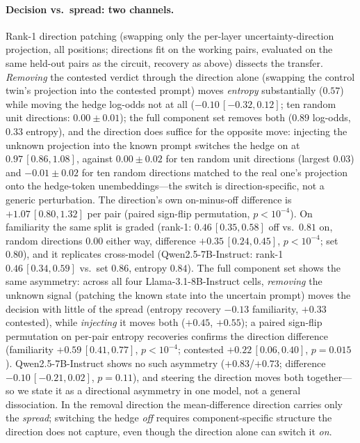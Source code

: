 \documentclass{article}
\newcommand{\lm}{Llama-3.1-8B-Instruct}
\newcommand{\qw}{Qwen2.5-7B-Instruct}
\begin{document}
\paragraph{Decision vs.\ spread: two channels.}
Rank-1 direction patching (swapping only the per-layer uncertainty-direction projection, all positions;
directions fit on the working pairs, evaluated on the same held-out pairs as the circuit, recovery as
above) dissects the transfer. \emph{Removing} the contested verdict through the direction alone (swapping
the control twin's projection into the contested prompt) moves \emph{entropy} substantially ($0.57$)
while moving the hedge log-odds not at all ($-0.10\,[-0.32,0.12]$; ten random unit directions:
$0.00 \pm 0.01$); the full component set removes both ($0.89$ log-odds, $0.33$ entropy), and the
direction does suffice for the opposite move: injecting the unknown projection into the known prompt
switches the hedge on at $0.97\,[0.86,1.08]$, against $0.00 \pm 0.02$ for ten random unit directions
(largest $0.03$) and $-0.01 \pm 0.02$ for ten random directions matched to the real one's projection
onto the hedge-token unembeddings---the switch is direction-specific, not a generic perturbation. The
direction's own on-minus-off difference is $+1.07\,[0.80,1.32]$ per pair (paired sign-flip permutation,
$p<10^{-4}$). On familiarity the same split is graded (rank-1: $0.46\,[0.35,0.58]$ off vs.\ $0.81$ on,
random directions $0.00$ either way, difference $+0.35\,[0.24,0.45]$, $p<10^{-4}$; set $0.80$), and it
replicates cross-model (\qw{}: rank-1 $0.46\,[0.34,0.59]$ vs.\ set $0.86$, entropy
$0.84$). The full component set shows the same asymmetry: across all
four \lm{} cells, \emph{removing} the unknown signal (patching the known state into the uncertain prompt)
moves the decision with little of the spread (entropy recovery $-0.13$ familiarity, $+0.33$ contested),
while \emph{injecting} it moves both ($+0.45$, $+0.55$); a paired sign-flip permutation on per-pair
entropy recoveries confirms the direction difference (familiarity $+0.59\,[0.41,0.77]$, $p<10^{-4}$;
contested $+0.22\,[0.06,0.40]$, $p{=}0.015$). \qw{} shows no such asymmetry ($+0.83$/$+0.73$; difference
$-0.10\,[-0.21,0.02]$, $p{=}0.11$), and steering the direction moves both together---so we state it
as a directional asymmetry in one model, not a general dissociation. In the removal direction the mean-difference direction carries only the \emph{spread}; switching the hedge
\emph{off} requires component-specific structure the direction does not capture, even though the direction
alone can switch it \emph{on}.
\end{document}
